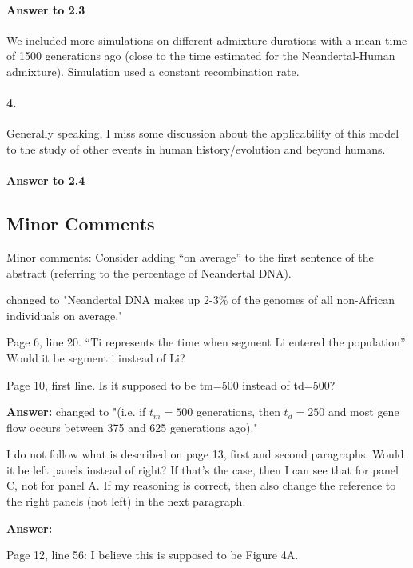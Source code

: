 \documentclass[11pt]{article}
\let\oldparagraph\paragraph
\renewcommand{\paragraph}[1]{\oldparagraph{#1}\mbox{}}
\begin{document}
\paragraph{Answer to 2.3}
We included more simulations on different admixture durations with a mean time of 1500 generations ago (close to the time estimated for the Neandertal-Human admixture). Simulation used a constant recombination rate. 

\paragraph{4.}
Generally speaking, I miss some discussion about the applicability of this model to the study of other events in human history/evolution and beyond humans.

\paragraph{Answer to 2.4}

\subsection{Minor Comments}\label{Minor Comments}

Minor comments:
Consider adding “on average” to the first sentence of the abstract (referring to the percentage of Neandertal DNA).

 changed to "Neandertal DNA makes up 2-3\% of the genomes of all non-African individuals on average."

Page 6, line 20. “Ti represents the time when segment Li entered the population” Would it be segment i instead of Li? 


Page 10, first line. Is it supposed to be tm=500 instead of td=500?

\textbf{Answer:} changed to "(i.e. if $t_m= 500$ generations, then $t_d = 250$ and most gene flow occurs between  375 and 625
generations ago)."


I do not follow what is described on page 13, first and second paragraphs. Would it be left panels instead of right? If that’s the case, then I can see that for panel C, not for panel A. If my reasoning is correct, then also change the reference to the right panels (not left) in the next paragraph.

\textbf{Answer:} 

Page 12, line 56: I believe this is supposed to be Figure 4A. 
\end{document}
